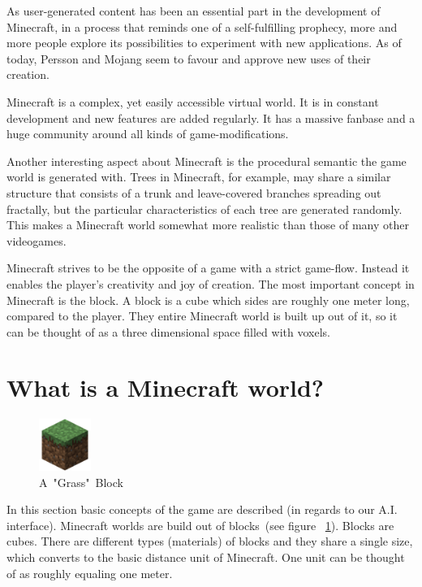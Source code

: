 As user-generated content has been an essential part in the development of Minecraft, in a process that reminds one of a self-fulfilling prophecy, more and more people explore its possibilities to experiment with new applications. As of today, Persson and Mojang seem to favour and approve new uses of their creation.~\cite{Duncan:2011:MBC:2207096.2207097}

Minecraft is a complex, yet easily accessible virtual world. It is in constant development and new features are added regularly. It has a massive fanbase and a huge community around all kinds of game-modifications.

Another interesting aspect about Minecraft is the procedural semantic the game world is generated with. Trees in Minecraft, for example, may share a similar structure that consists of a trunk and leave-covered branches spreading out fractally, but the particular characteristics of each tree are generated randomly. This makes a Minecraft world somewhat more realistic than those of many other videogames.

Minecraft strives to be the opposite of a game with a strict game-flow. Instead it enables the player's creativity and joy of creation. The most important concept in Minecraft is the block. A block is a cube which sides are roughly one meter long, compared to the player. They entire Minecraft world is built up out of it, so it can be thought of as a three dimensional space filled with voxels.~\cite{baloghcodemetropolis}

    \section{What is a Minecraft world?}

\begin{figure}
  \begin{center}
    \includegraphics[width=0.15\textwidth]{graphics/block}
  \end{center}
  \caption{A~"Grass"~Block~\cite{image_mob}}
  \label{mc_block}
\end{figure}

In this section basic concepts of the game are described (in regards to our A.I. interface). Minecraft worlds are build out of blocks~(see figure ~\ref{mc_block}). Blocks are cubes. There are different types (materials) of blocks and they share a single size, which converts to the basic distance unit of Minecraft. One unit can be thought of as roughly equaling one meter.

